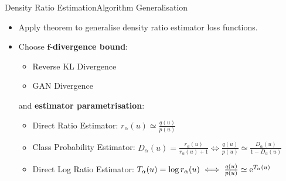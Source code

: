 \documentclass[handout]{beamer}
\newcommand{\E}{\mathbb{E}}
\begin{document}
\begin{frame}{Density Ratio Estimation}{Algorithm Generalisation}
\begin{itemize}
\item Apply theorem to generalise density ratio estimator loss functions.
\vspace{0.4cm}
\item Choose $\bm{f}$-\textbf{divergence bound}:
\begin{itemize}
\item Reverse KL Divergence
\vspace{0.2cm}
\item GAN Divergence
\end{itemize}
\vspace{0.3cm}
and \textbf{estimator parametrisation}:
\begin{itemize}
\item Direct Ratio Estimator: $r_\alpha(u)\simeq \frac{q(u)}{p(u)}$
\vspace{0.1cm}
\item Class Probability Estimator: $D_\alpha(u)=\frac{r_\alpha(u)}{r_\alpha(u)+1}\iff \frac{q(u)}{p(u)}\simeq \frac{D_\alpha(u)}{1-D_\alpha(u)}$
\vspace{0.1cm}
\item Direct Log Ratio Estimator: $T_\alpha(u)=\log r_\alpha(u)\iff \frac{q(u)}{p(u)}\simeq {\rm e}^{T_\alpha(u)}$
\end{itemize}
\end{itemize}
\end{frame}
\end{document}
